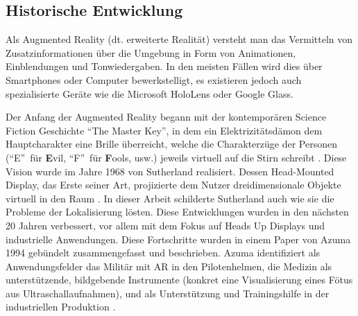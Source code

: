 \documentclass[a4paper]{scrreprt}
\begin{document}
\subsection{Historische Entwicklung}

Als Augmented Reality (dt. erweiterte Realität) versteht man das Vermitteln von Zusatzinformationen über die Umgebung in Form von Animationen, Einblendungen und Tonwiedergaben. In den meisten Fällen wird dies über Smartphones oder Computer bewerkstelligt, es existieren jedoch auch spezialisierte Geräte wie die Microsoft HoloLens oder Google Glass.

Der Anfang der Augmented Reality begann mit der kontemporären Science Fiction Geschichte \textquotedblleft The Master Key\textquotedblright, in dem ein Elektrizitätsdämon dem Hauptcharakter eine Brille überreicht, welche die Charakterzüge der Personen (\textquotedblleft E\textquotedblright\ für \textbf{E}vil, \textquotedblleft F\textquotedblright\ für \textbf{F}ools, usw.) jeweils virtuell auf die Stirn schreibt \parencite{Baum1901}.
Diese Vision wurde im Jahre 1968 von Sutherland realisiert. Dessen Head-Mounted Display, das Erste seiner Art, projizierte dem Nutzer dreidimensionale Objekte virtuell in den Raum \parencite{Sutherland1968}. In dieser Arbeit schilderte Sutherland auch wie sie die Probleme der Lokalisierung lösten. Diese Entwicklungen wurden in den nächsten 20 Jahren verbessert, vor allem mit dem Fokus auf Heads Up Displays und industrielle Anwendungen. Diese Fortschritte wurden in einem Paper von Azuma 1994 gebündelt zusammengefasst und beschrieben. Azuma identifiziert als Anwendungsfelder das Militär mit AR in den Pilotenhelmen, die Medizin als unterstützende, bildgebende Instrumente (konkret eine Visualisierung eines Fötus aus Ultraschallaufnahmen), und als Unterstützung und Trainingshilfe in der industriellen Produktion \parencite{Azuma1997}.
\end{document}
